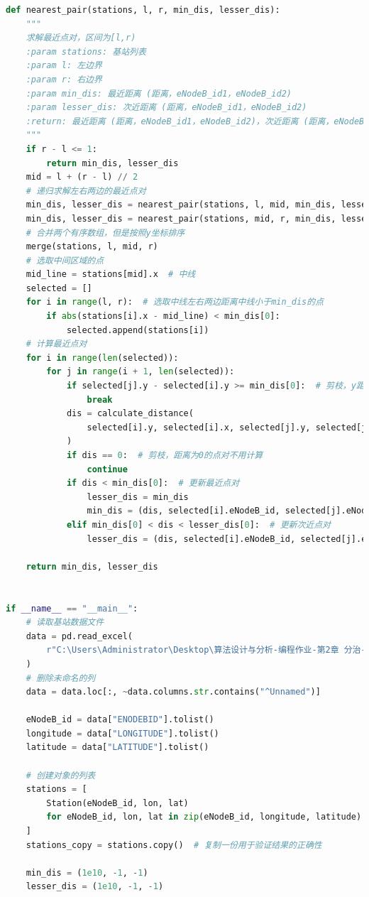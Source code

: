 \documentclass[lang=cn,11pt,a4paper]{elegantpaper}
\begin{document}
\begin{lstlisting}[language=python]
def nearest_pair(stations, l, r, min_dis, lesser_dis):
    """
    求解最近点对，区间为[l,r)
    :param stations: 基站列表
    :param l: 左边界
    :param r: 右边界
    :param min_dis: 最近距离 (距离，eNodeB_id1，eNodeB_id2)
    :param lesser_dis: 次近距离 (距离，eNodeB_id1，eNodeB_id2)
    :return: 最近距离 (距离，eNodeB_id1，eNodeB_id2)，次近距离 (距离，eNodeB_id1，eNodeB_id2)
    """
    if r - l <= 1:
        return min_dis, lesser_dis
    mid = l + (r - l) // 2
    # 递归求解左右两边的最近点对
    min_dis, lesser_dis = nearest_pair(stations, l, mid, min_dis, lesser_dis)
    min_dis, lesser_dis = nearest_pair(stations, mid, r, min_dis, lesser_dis)
    # 合并两个有序数组，但是按照y坐标排序
    merge(stations, l, mid, r)
    # 选取中间区域的点
    mid_line = stations[mid].x  # 中线
    selected = []
    for i in range(l, r):  # 选取中线左右两边距离中线小于min_dis的点
        if abs(stations[i].x - mid_line) < min_dis[0]:
            selected.append(stations[i])
    # 计算最近点对
    for i in range(len(selected)):
        for j in range(i + 1, len(selected)):
            if selected[j].y - selected[i].y >= min_dis[0]:  # 剪枝，y距离大于min_dis的点不用计算
                break
            dis = calculate_distance(
                selected[i].y, selected[i].x, selected[j].y, selected[j].x
            )
            if dis == 0:  # 剪枝，距离为0的点对不用计算
                continue
            if dis < min_dis[0]:  # 更新最近点对
                lesser_dis = min_dis
                min_dis = (dis, selected[i].eNodeB_id, selected[j].eNodeB_id)
            elif min_dis[0] < dis < lesser_dis[0]:  # 更新次近点对
                lesser_dis = (dis, selected[i].eNodeB_id, selected[j].eNodeB_id)

    return min_dis, lesser_dis


if __name__ == "__main__":
    # 读取基站数据文件
    data = pd.read_excel(
        r"C:\Users\Administrator\Desktop\算法设计与分析-编程作业-第2章 分治-2023\02-1 1033个基站数据.xls"
    )
    # 删除未命名的列
    data = data.loc[:, ~data.columns.str.contains("^Unnamed")]

    eNodeB_id = data["ENODEBID"].tolist()
    longitude = data["LONGITUDE"].tolist()
    latitude = data["LATITUDE"].tolist()

    # 创建对象的列表
    stations = [
        Station(eNodeB_id, lon, lat)
        for eNodeB_id, lon, lat in zip(eNodeB_id, longitude, latitude)
    ]
    stations_copy = stations.copy()  # 复制一份用于验证结果的正确性

    min_dis = (1e10, -1, -1)
    lesser_dis = (1e10, -1, -1)


\end{lstlisting}
\end{document}
